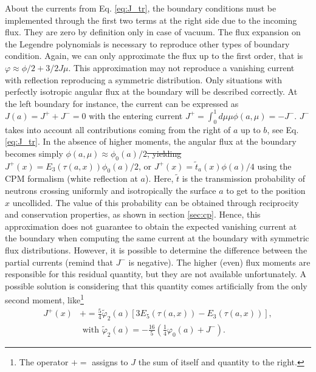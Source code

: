 \documentclass{ictt26}
\newcommand{\pluseq}{\mathrel{+}=}
\providecommand{\DIFadd}[1]{{\protect\color{blue}\uwave{#1}}} %
\providecommand{\DIFdel}[1]{{\protect\color{red}\sout{#1}}}                      %
\providecommand{\DIFaddbegin}{} %
\providecommand{\DIFaddend}{} %
\providecommand{\DIFdelbegin}{} %
\providecommand{\DIFdelend}{} %
\newcommand{\DIFscaledelfig}{0.5}
\newlength{\DIFdelgraphicswidth} %
\newlength{\DIFdelgraphicsheight} %
\newcommand{\DIFaddincludegraphics}[2][]{{\color{blue}\fbox{\DIFOincludegraphics[#1]{#2}}}} %
\newcommand{\DIFdelincludegraphics}[2][]{%
\sbox{\DIFdelgraphicsbox}{\DIFOincludegraphics[#1]{#2}}%
\settoboxwidth{\DIFdelgraphicswidth}{\DIFdelgraphicsbox} %
\settoboxtotalheight{\DIFdelgraphicsheight}{\DIFdelgraphicsbox} %
\scalebox{\DIFscaledelfig}{%
\parbox[b]{\DIFdelgraphicswidth}{\usebox{\DIFdelgraphicsbox}\\[-\baselineskip] \rule{\DIFdelgraphicswidth}{0em}}\llap{\resizebox{\DIFdelgraphicswidth}{\DIFdelgraphicsheight}{%
\setlength{\unitlength}{\DIFdelgraphicswidth}%
\begin{picture}(1,1)%
\thicklines\linethickness{2pt} %
{\color[rgb]{1,0,0}\put(0,0){\framebox(1,1){}}}%
{\color[rgb]{1,0,0}\put(0,0){\line( 1,1){1}}}%
{\color[rgb]{1,0,0}\put(0,1){\line(1,-1){1}}}%
\end{picture}%
}\hspace*{3pt}}} %
} %
\DeclareRobustCommand{\DIFaddbegin}{\DIFOaddbegin \let\includegraphics\DIFaddincludegraphics} %
\DeclareRobustCommand{\DIFaddend}{\DIFOaddend \let\includegraphics\DIFOincludegraphics} %
\DeclareRobustCommand{\DIFdelbegin}{\DIFOdelbegin \let\includegraphics\DIFdelincludegraphics} %
\DeclareRobustCommand{\DIFdelend}{\DIFOaddend \let\includegraphics\DIFOincludegraphics} %
\begin{document}
About the currents from Eq. \ref{eq:J_tr}, the boundary conditions must be implemented through the first two terms at the right side due to the incoming flux. They are zero by definition only in case of vacuum. The flux expansion on the Legendre polynomials is necessary to reproduce other types of boundary condition. Again, we can only approximate the flux up to the first order, that is $\varphi \approx \phi/2 + 3/2 J \mu$. This approximation may not reproduce a vanishing current with reflection reproducing a symmetric distribution. Only situations with perfectly isotropic angular flux at the boundary will be described correctly. At the left boundary for instance, the current can be expressed as $J(a) =  J^+ + J^- = 0$ with the entering current \DIFdelbegin \DIFdel{$J^+ = \int_0^1 { d\mu \mu \phi(a, \mu) } = - J^-$}\DIFdelend \DIFaddbegin \DIFadd{$J^+ = \int_0^1 { d\mu \mu \varphi(a, \mu) } = - J^-$}\DIFaddend . $J^-$ takes into account all contributions coming from the right of $a$ up to $b$, see Eq. \ref{eq:J_tr}. In the absence of higher moments, the angular flux at the boundary becomes simply \DIFdelbegin \DIFdel{$\phi(a, \mu) \approx \phi_0(a) / 2$, yielding $J^+(x) = E_3 \left(\tau(a, x)\right)\phi_0(a)/2$}\DIFdelend \DIFaddbegin \DIFadd{$\phi(a, \mu) \approx \varphi_0(a) / 2$, yielding $J^+(x) = E_3 \left(\tau(a, x)\right) \varphi_0(a)/2$}\DIFaddend , or $J^+(x) = \tilde{t}_a(x) \phi(a)/4$ using the CPM formalism (white reflection at $a$). Here, $\tilde{t}$ is the transmission probability of neutrons crossing uniformly and isotropically the surface $a$ to get to the position $x$ uncollided. The value of this probability can be obtained through reciprocity and conservation properties, as shown in section \ref{sec:cp}. Hence, this approximation does not guarantee to obtain the expected vanishing current at the boundary when computing the same current at the boundary with symmetric flux distributions. However, it is possible to determine the difference between the partial currents (remind that $J^-$ is negative). The higher (even) flux moments are responsible for this residual quantity, but they are not available unfortunately. A possible solution is considering that this quantity comes artificially from the only second moment, like\footnote{The operator $\pluseq$ assigns to $J$ the sum of itself and quantity to the right.}
\begin{equation}
\DIFdelbegin %
\DIFdelend \DIFaddbegin \begin{split}
J^+(x) &\pluseq \frac{5}{4} \tilde{\varphi}_2(a) \left[ 3 E_5(\tau(a, x)) - E_3(\tau(a, x)) \right],\\ &\text{ with } \tilde{\varphi}_2(a) = - \frac{16}{5} \left( \frac{1}{4} \varphi_0(a) + J^- \right).
\end{split}\DIFaddend 
\end{equation}
\end{document}
